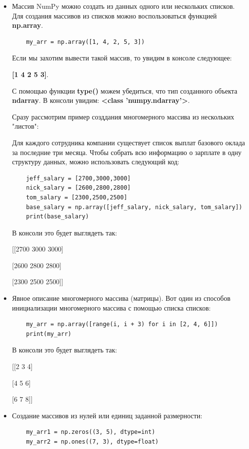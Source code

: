 \documentclass[pract]{SCWorks}
\begin{document}
\begin{itemize}
    \item Массив NumPy можно создать из данных одного или нескольких списков. Для создания массивов из 
    списков можно воспользоваться функцией \textbf{np.array}.
    \begin{verbatim}
    my_arr = np.array([1, 4, 2, 5, 3])    
    \end{verbatim}

    Если мы захотим вывести такой массив, то увидим в консоле следующее: 
    
    \textbf{[1 4 2 5 3]}.
    
    С помощью функции \textbf{type()} можем убедиться, что тип созданного объекта \textbf{ndarray}.
    В консоли увидим: \textbf{<class 'numpy.ndarray'>}.
    
    Сразу рассмотрим пример созддания многомерного массива из нескольких "листов": 
    
    Для каждого сотрудника компании существует список выплат базового оклада за последние 
    три месяца. Чтобы собрать всю информацию о зарплате в одну структуру данных, можно использовать 
    следующий код:

    \begin{verbatim}
    jeff_salary = [2700,3000,3000]
    nick_salary = [2600,2800,2800]
    tom_salary = [2300,2500,2500]
    base_salary = np.array([jeff_salary, nick_salary, tom_salary])
    print(base_salary)
    \end{verbatim}

    В консоли это будет выглядеть так:

    [[2700 3000 3000]

    [2600 2800 2800]

    [2300 2500 2500]]

    \item Явное описание многомерного массива (матрицы). Вот один из способов инициализации многомерного
    массива с помощью списка списков:

    \begin{verbatim}
    my_arr = np.array([range(i, i + 3) for i in [2, 4, 6]])
    print(my_arr)
    \end{verbatim}

    В консоли это будет выглядеть так:

    [[2 3 4]
    
    [4 5 6]
    
    [6 7 8]]

    \item Создание массивов из нулей или единиц заданной размерности:
    \begin{verbatim}
    my_arr1 = np.zeros((3, 5), dtype=int)
    my_arr2 = np.ones((7, 3), dtype=float)


\end{verbatim}
\end{itemize}
\end{document}
